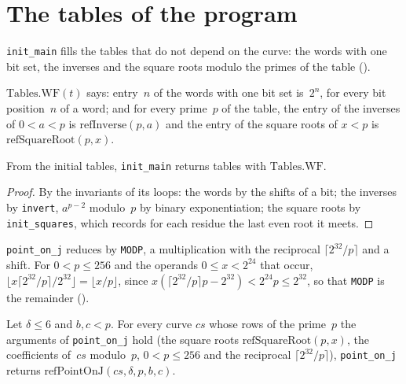 \section{The tables of the program}\label{sec:sieveTables}

\texttt{init\_main} fills the tables that do not depend on the curve: the words with one bit set,
the inverses and the square roots modulo the primes of the table ().

\begin{definition}\label{def:Tables.WF}
  \leanok
  $\mathrm{Tables.WF}(t)$ says: entry~$n$ of the words with one bit set is~$2^n$, for every bit
  position~$n$ of a word; and for every prime~$p$ of the table, the entry of the inverses of
  $0 < a < p$ is $\mathrm{refInverse}(p, a)$ and the entry of the square roots of $x < p$ is
  $\mathrm{refSquareRoot}(p, x)$.
\end{definition}

\begin{lemma}\label{lem:initMain_spec}
  \leanok
  From the initial tables, \texttt{init\_main} returns tables with $\mathrm{Tables.WF}$.
\end{lemma}

\begin{proof}
  \leanok
  By the invariants of its loops: the words by the shifts of a bit; the inverses by \texttt{invert},
  $a^{p - 2}$ modulo~$p$ by binary exponentiation; the square roots by \texttt{init\_squares}, which
  records for each residue the last even root it meets.
\end{proof}

\texttt{point\_on\_j} reduces by \texttt{MODP}, a multiplication with the reciprocal
$\lceil 2^{32} / p \rceil$ and a shift. For $0 < p \le 256$ and the operands $0 \le x < 2^{24}$ that
occur, $\lfloor x \lceil 2^{32}/p \rceil / 2^{32} \rfloor = \lfloor x / p \rfloor$, since
$x (\lceil 2^{32}/p \rceil p - 2^{32}) < 2^{24} p \le 2^{32}$, so that \texttt{MODP} is the
remainder ().

\begin{lemma}\label{lem:pointOnJ_spec}
  \leanok
  Let $\delta \le 6$ and $b, c < p$. For every curve $\mathit{cs}$ whose rows of the prime~$p$ the
  arguments of \texttt{point\_on\_j} hold (the square roots $\mathrm{refSquareRoot}(p, x)$, the
  coefficients of~$\mathit{cs}$ modulo~$p$, $0 < p \le 256$ and the reciprocal
  $\lceil 2^{32} / p \rceil$), \texttt{point\_on\_j} returns
  $\mathrm{refPointOnJ}(\mathit{cs}, \delta, p, b, c)$.
\end{lemma}

